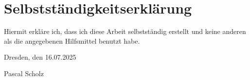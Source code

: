
\section*{\vfill{} \thispagestyle{empty}
Selbstständigkeitserklärung}

Hiermit erkläre ich, dass ich diese Arbeit selbstständig erstellt
und keine anderen als die angegebenen Hilfsmittel benutzt habe.
\bigskip{}

\noindent Dresden, den 16.07.2025 %
\vspace{2.5cm}

\noindent Pascal Scholz \cleardoublepage{}

